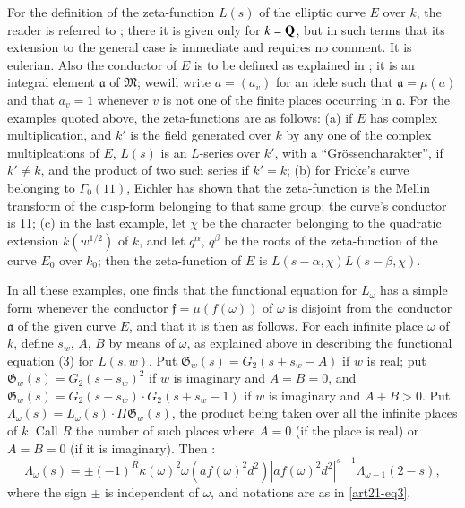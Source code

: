 For the definition of the zeta-function $L(s)$ of the elliptic curve $E$ over $k$, the reader is referred to \cite{art21-key2}; there it is given only for $k=\mathbf{Q}$, but in such terms that its extension to the general case is immediate and requires no comment. It is eulerian. Also the conductor of $E$ is to be defined as explained in \cite{art21-key2}; it is an integral element $\mathfrak{a}$ of $\mathfrak{M}$; we\pageoriginale will write $a=(a_{v})$ for an idele such that $\mathfrak{a}=\mu(a)$ and that $a_{v}=1$ whenever $v$ is not one of the finite places occurring in $\mathfrak{a}$. For the examples quoted above, the zeta-functions are as follows: (a) if $E$ has complex multiplication, and $k'$ is the field generated over $k$ by any one of the complex multiplcations of $E$, $L(s)$ is an $L$-series over $k'$, with a ``Gr\"ossencharakter'', if $k'\neq k$, and the product of two such series if $k'=k$; (b) for Fricke's curve belonging to $\Gamma_{0}(11)$, Eichler has shown that the zeta-function is the Mellin transform of the cusp-form belonging to that same group; the curve's conductor is 11; (c) in the last example, let $\chi$ be the character belonging to the quadratic extension $k(w^{1/2})$ of $k$, and let $q^{\alpha}$, $q^{\beta}$ be the roots of the zeta-function of the curve $E_{0}$ over $k_{0}$; then the zeta-function of $E$ is $L(s-\alpha,\chi)L(s-\beta,\chi)$.

In all these examples, one finds that the functional equation for $L_{\omega}$ has a simple form whenever the conductor $\mathfrak{f}=\mu(f(\omega))$ of $\omega$ is disjoint from the conductor $\mathfrak{a}$ of the given curve $E$, and that it is then as follows. For each infinite place $\omega$ of $k$, define $s_{w}$, $A$, $B$ by means of $\omega$, as explained above in describing the functional equation (3) for $L(s,w)$. Put $\mathfrak{G}_{w}(s)=G_{2}(s+s_{w}-A)$ if $w$ is real; put $\mathfrak{G}_{w}(s)=G_{2}(s+s_{w})^{2}$ if $w$ is imaginary and $A=B=0$, and $\mathfrak{G}_{w}(s)=G_{2}(s+s_{w})\cdot G_{2}(s+s_{w}-1)$ if $w$ is imaginary and $A+B>0$. Put $\Lambda_{\omega}(s)=L_{\omega}(s)\cdot \Pi\mathfrak{G}_{w}(s)$, the product being taken over all the infinite places of $k$. Call $R$ the number of such places where $A=0$ (if the place is real) or $A=B=0$ (if it is imaginary). Then :
\begin{equation}
\Lambda_{\omega}(s)=\pm (-1)^{R}\kappa(\omega)^{2}\omega(af(\omega)^{2}d^{2})|af(\omega)^{2}d^{2}|^{s-1}\Lambda_{\omega-1}(2-s),\label{art21-eq5}
\end{equation}
where the sign $\pm$ is independent of $\omega$, and notations are as in \eqref{art21-eq3}.

